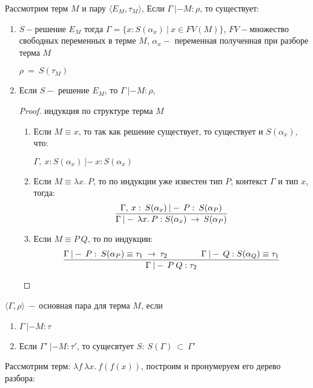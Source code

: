 	\begin{lemma}
	Рассмотрим терм $M$ и пару $\big\langle E_M, \tau_M\big\rangle$, Если $\Gamma\:|-M:\rho$, то существует:
	\end{lemma}	
		\begin{enumerate}
		\item $S-$решение $E_M$ тогда $\Gamma=\{x : S(\alpha_x)\:|\:x\in FV(M)\}$, $FV-$множество свободных переменных в терме $M$, $\alpha_x-$ переменная полученная при разборе терма $M$\par
		$\rho\:=\:S(\tau_M)$
		\item Если $S-$ решение $E_M$, то $\Gamma\:|-M:\rho$,
		\begin{proof}индукция по структуре терма $M$

			\begin{enumerate}
				\item Если $M\equiv x$, то так как решение существует, то существует и $S(\alpha_x)$, что: \par$\Gamma,\:x:S(\alpha_x)\:|-\:x:S(\alpha_x)$
				\item Если $M\equiv \lambda x.\:P$, то по индукции уже известен тип $P$, контекст $\Gamma$ и тип $x$, тогда: $${\Gamma,\:x:\:S(\alpha_x)\:|-\:P:\:S(\alpha_P) \over \Gamma\:|-\:\lambda x.\:P:S(\alpha_x)\:\rightarrow\:S(\alpha_P)}$$
				\item Если $M\equiv P\:Q$, то по индукции: $${ \Gamma\:|-\:P:\:S(\alpha_P)\equiv\tau_1\:\rightarrow\:\tau_2 \hspace{4em} \Gamma\:|-\:Q:S(\alpha_Q)\equiv\tau_1\over \Gamma\:|-\:P\:Q:\tau_2}$$
			\end{enumerate}					
		\end{proof}
	\end{enumerate}				
		 $\big \langle\Gamma,\rho\big\rangle\:-\:$основная пара для терма $M$, если 
		 \begin{enumerate}
			\item $\Gamma\:|-M:\tau$
			\item Если $\Gamma'\:|-M:\tau'$, то сущесвтует $S:\:S(\Gamma)\:\subset\:\Gamma'$
		 \end{enumerate}
		 \begin{example}
		\end{example}
		 	Рассмотрим терм: $\lambda f\:\lambda x.\:f(f(x))$, построим и пронумеруем его дерево разбора:\par
